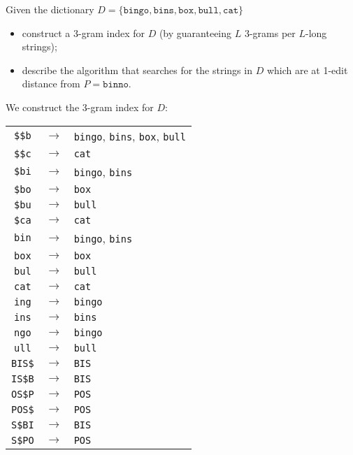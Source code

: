 \exercise

Given the dictionary $D = \{\texttt{bingo}, \texttt{bins}, \texttt{box},
\texttt{bull}, \texttt{cat}\}$
%
\begin{itemize}

  \item construct a 3-gram index for $D$ (by guaranteeing $L$ 3-grams per
  $L$-long strings);

  \item describe the algorithm that searches for the strings in $D$ which are at
  1-edit distance from $P = \texttt{binno}$.

\end{itemize}

\solution

We construct the 3-gram index for $D$:
%
  \begin{longtable}{ccl}
    \texttt{\$\$b} & $\rightarrow$ & \texttt{bingo}, \texttt{bins},
    \texttt{box}, \texttt{bull} \\
    \texttt{\$\$c} & $\rightarrow$ & \texttt{cat} \\
    \texttt{\$bi} & $\rightarrow$ & \texttt{bingo}, \texttt{bins} \\
    \texttt{\$bo} & $\rightarrow$ & \texttt{box} \\
    \texttt{\$bu} & $\rightarrow$ & \texttt{bull} \\
    \texttt{\$ca} & $\rightarrow$ & \texttt{cat} \\
    \texttt{bin} & $\rightarrow$ & \texttt{bingo}, \texttt{bins} \\
    \texttt{box} & $\rightarrow$ & \texttt{box} \\
    \texttt{bul} & $\rightarrow$ & \texttt{bull} \\
    \texttt{cat} & $\rightarrow$ & \texttt{cat} \\
    \texttt{ing} & $\rightarrow$ & \texttt{bingo} \\
    \texttt{ins} & $\rightarrow$ & \texttt{bins} \\
    \texttt{ngo} & $\rightarrow$ & \texttt{bingo} \\
    \texttt{ull} & $\rightarrow$ & \texttt{bull} \\
    \texttt{BIS\$} & $\rightarrow$ & \texttt{BIS} \\
    \texttt{IS\$B} & $\rightarrow$ & \texttt{BIS} \\
    \texttt{OS\$P} & $\rightarrow$ & \texttt{POS} \\
    \texttt{POS\$} & $\rightarrow$ & \texttt{POS} \\
    \texttt{S\$BI} & $\rightarrow$ & \texttt{BIS} \\
    \texttt{S\$PO} & $\rightarrow$ & \texttt{POS} \\
  \end{longtable}
